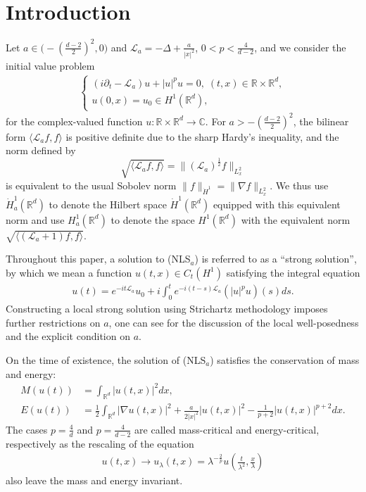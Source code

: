 \documentclass[12pt]{amsart}
\newcommand{\R}{\mathbb R}
\newcommand{\dha}{\dot H^1_a}
\newcommand{\la}{\mathcal L_a}
\newcommand{\nha}{H^1_a}
\begin{document}
\section{Introduction} Let $a\in \big(-(\tfrac{d-2}2)^2,0\big)$ and $\la=-\Delta+\frac a{|x|^2}$, $0<p<\frac 4{d-2}$, and we consider the initial value problem 
\begin{align*}
\begin{cases}
(i\partial_t-\la)u+|u|^p u=0, \; (t,x)\in \R\times \R^d, \\
u(0,x)=u_0\in H^1(\R^d), 
\end{cases}\tag{NLS$_a$}
\end{align*}
for the complex-valued function $u:\R\times\R^d\to \mathbb C$. 
For $a>-(\tfrac{d-2}2)^2$, the bilinear form $\langle \la f, f\rangle$ is positive definite due to the sharp Hardy's inequality, and the norm defined by
\[
\sqrt{\langle\la f,f\rangle}=\|(\la)^{\frac 12} f\|_{L_x^2}
\]
is equivalent to the usual Sobolev norm $\|f\|_{\dot H^1}=\|\nabla f\|_{L_x^2}$. We thus use $\dha(\R^d)$ to denote the Hilbert space $\dot H^1(\R^d)$ equipped with this equivalent norm and use $\nha(\R^d)$ to denote the space $H^1(\R^d)$ with the equivalent norm $\sqrt{\langle(\la+1)f, f\rangle}$. 

Throughout this paper, a solution  to (NLS$_a$) is referred to as a ``strong solution'', by which we mean a function $u(t,x)\in C_t(H^1)$ satisfying the integral equation 
\begin{align*}
u(t)=e^{-it\la} u_0+i\int_0^t e^{-i(t-s)\la}(|u|^p u)(s) ds.
\end{align*}
Constructing a local strong solution using Strichartz methodology imposes further restrictions on $a$, one can see  \cite{KMVZ17,  KMVZZ17, LMM18} for the discussion of the local well-posedness and the explicit condition on $a$. 


On the time of existence, the solution of (NLS$_a$) satisfies the conservation of mass and energy: 
\begin{align*}
M(u(t))&=\int_{\R^d} |u(t,x)|^2 dx, \\
E(u(t))&=\frac 12 \int_{\R^d} |\nabla u(t,x)|^2 +\frac a{2|x|^2}|u(t,x)|^2 -\frac 1{p+2} |u(t,x)|^{p+2} dx. 
\end{align*}
The cases $p=\frac 4d$ and $p=\frac 4{d-2}$ are called mass-critical and energy-critical, respectively as the rescaling of the equation 
\begin{align*}
u(t,x)\to u_{\lambda}(t,x)=\lambda^{-\frac 2p}u(\tfrac t{\lambda^2}, \tfrac x\lambda)
\end{align*}
also leave the mass and energy invariant. 
\end{document}

